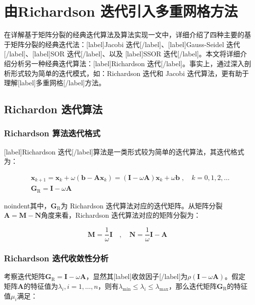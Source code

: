\documentclass[12pt, UTF8, nofonts]{ctexart}
\begin{document}

\section*{由Richardson 迭代引入多重网格方法}

在详解基于矩阵分裂的经典迭代算法及算法实现一文中，详细介绍了四种主要的基于矩阵分裂的经典迭代法：[label]Jacobi 迭代[/label]、[label]Gauss-Seidel 迭代[/label]、[label]SOR 迭代[/label]、以及 [label]SSOR 迭代[/label]。本文将详细介绍分析另一种经典迭代算法：[label]Richardson 迭代[/label]。事实上，通过深入剖析形式较为简单的迭代模式，如：Richardson 迭代和 Jacobi 迭代算法，更有助于理解[label]多重网格[/label]方法。

\subsection*{Richardon 迭代算法}

\subsubsection*{Richardson 算法迭代格式}

[label]Richardson 迭代[/label]算法是一类形式较为简单的迭代算法，其迭代格式为：

\begin{eqnarray}
  \label{eq:richarditer}
  & \boldsymbol{x}_{k+1} = \boldsymbol{x}_k + \omega(\boldsymbol{b} - \boldsymbol{Ax}_k) = (\boldsymbol{I}-\omega\boldsymbol{A})\boldsymbol{x}_k + \omega\boldsymbol{b} \;,\quad k=0,1,2,\ldots \\
  & \boldsymbol{G}_{\mathrm{R}} = \boldsymbol{I} - \omega\boldsymbol{A}
\end{eqnarray}

noindent其中，$\boldsymbol{G}_{\mathrm{R}}$为 Richardson 迭代算法对应的迭代矩阵。从矩阵分裂$\boldsymbol{A}=\boldsymbol{M}-\boldsymbol{N}$角度来看，Richardson 迭代算法对应的矩阵分裂为：

\begin{equation*}
  \boldsymbol{M} = \dfrac{1}{\omega}\boldsymbol{I} \quad,\quad
  \boldsymbol{N} = \dfrac{1}{\omega}\boldsymbol{I} - \boldsymbol{A}
\end{equation*}

\subsubsection*{Richardson 迭代收敛性分析}

考察迭代矩阵$\boldsymbol{G}_{\mathrm{R}}=\boldsymbol{I}-\omega\boldsymbol{A}$，显然其[label]收敛因子[/label]为$\rho(\boldsymbol{I}-\omega\boldsymbol{A})$。假定矩阵$\boldsymbol{A}$的特征值为$\lambda_i,i=1,\ldots,n$，则有$\lambda_{\min}\leq\lambda_i\leq\lambda_{\max}$，那么迭代矩阵$\boldsymbol{G}_{\mathrm{R}}$的特征值$\mu_i$满足：
\end{document}
